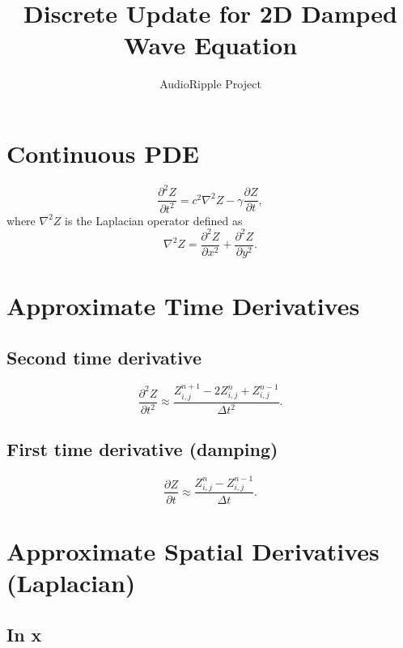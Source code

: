 \documentclass{article}
\title{Discrete Update for 2D Damped Wave Equation}
\author{AudioRipple Project}
\date{}
\begin{document}
\maketitle

\section*{Continuous PDE}

\begin{equation}
\frac{\partial^2 Z}{\partial t^2}
= c^2 \nabla^2 Z - \gamma \frac{\partial Z}{\partial t},
\end{equation}
where $\nabla^2 Z$ is the Laplacian operator defined as
\begin{equation}
    \nabla^2 Z = \frac{\partial^2 Z}{\partial x^2} + \frac{\partial^2 Z}{\partial y^2}.
\end{equation}

\section*{Approximate Time Derivatives}

\subsection*{Second time derivative}

\begin{equation}
\frac{\partial^2 Z}{\partial t^2}
\approx
\frac{Z^{n+1}_{i,j} - 2Z^n_{i,j} + Z^{n-1}_{i,j}}{\Delta t^2}.
\end{equation}

\subsection*{First time derivative (damping)}

\begin{equation}
\frac{\partial Z}{\partial t}
\approx
\frac{Z^n_{i,j} - Z^{n-1}_{i,j}}{\Delta t}.
\end{equation}

\section*{Approximate Spatial Derivatives (Laplacian)}

\subsection*{In x}
\end{document}
